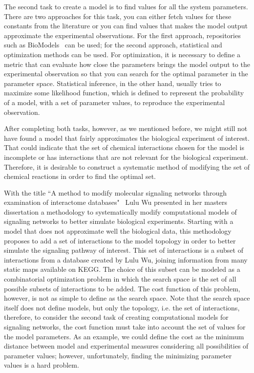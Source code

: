 The second task to create a model is to find values for all the system
parameters. There are two approaches for this task, you can either 
fetch values for these constants from the literature or you can find 
values that makes the model output approximate the experimental 
observations. For the first approach, repositories such as 
BioModels~\cite{le2006biomodels} can be used; for the second approach, 
statistical and optimization methods can be used. For optimization, it 
is necessary to define a metric that can evaluate how close the 
parameters brings the model output to the experimental observation so
that you can search for the optimal parameter in the parameter space. 
Statistical inference, in the other hand, usually tries to maximize some 
likelihood function, which is defined to represent the probability of a 
model, with a set of parameter values, to reproduce the experimental 
observation.

After completing both tasks, however, as we mentioned before, we might 
still not have found a model that fairly approximates the biological 
experiment of interest. That could indicate that the set of chemical 
interactions chosen for the model is incomplete or has interactions that
are not relevant for the biological experiment. Therefore, it is 
desirable to construct a systematic method of modifying the set of 
chemical reactions in order to find the optimal set.

With the title ``A method to modify molecular signaling networks through
examination of interactome databases"~\cite{Wu15} Lulu Wu presented in 
her masters dissertation a methodology to systematically modify 
computational models of signaling networks to better simulate biological 
experiments. Starting with a model that does not approximate well the 
biological data, this methodology proposes to add a set of interactions
to the model topology in order to better simulate the signaling pathway 
of interest. This set of interactions is a subset of interactions from a 
database created by Lulu Wu, joining information
from many static maps available on KEGG. The choice of this subset can 
be modeled as a combinatorial optimization problem in which the search 
space is the set of all possible subsets of interactions to be added.
The cost function of this problem, however, is not as simple to define 
as the search space. Note that the search space itself does not define 
models, but only the topology, i.e. the set of interactions, therefore, 
to consider the second task of creating computational models for 
signaling networks, the cost function must take into account the set of 
values for the model parameters. As an example, we could define the cost 
as the minimum distance between model and experimental measures 
considering all possibilities of parameter values; however, 
unfortunately, finding the minimizing parameter values is a hard 
problem.

